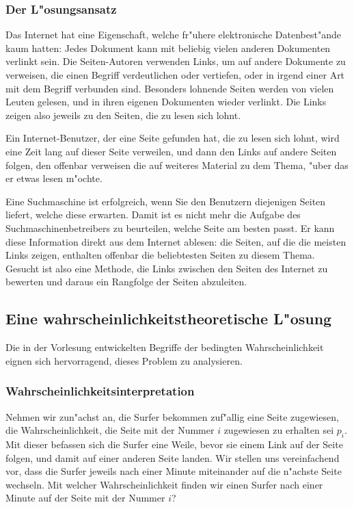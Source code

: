 \subsubsection{Der L"osungsansatz}
Das Internet hat eine Eigenschaft, welche fr"uhere elektronische 
Datenbest"ande kaum hatten: Jedes Dokument kann mit beliebig vielen anderen
Dokumenten verlinkt sein. Die Seiten-Autoren verwenden Links, um auf
andere Dokumente zu verweisen, die einen Begriff verdeutlichen oder
vertiefen, oder in irgend einer Art mit dem Begriff verbunden sind.
Besonders lohnende Seiten werden von vielen Leuten gelesen, und in ihren
eigenen Dokumenten wieder verlinkt. Die Links zeigen also jeweils zu den
Seiten, die zu lesen sich lohnt.

Ein Internet-Benutzer, der eine Seite gefunden hat, die zu lesen sich lohnt,
wird eine Zeit lang auf dieser Seite verweilen, und dann den Links auf
andere Seiten folgen, den offenbar verweisen die auf weiteres Material zu
dem Thema, "uber das er etwas lesen m"ochte.

Eine Suchmaschine ist erfolgreich, wenn Sie den Benutzern diejenigen Seiten
liefert, welche diese erwarten. Damit ist es nicht mehr die Aufgabe des
Suchmaschinenbetreibers zu beurteilen, welche Seite am besten passt. Er
kann diese Information direkt aus dem Internet ablesen: die Seiten, auf die
die meisten Links zeigen, enthalten offenbar die beliebtesten Seiten zu diesem
Thema. Gesucht ist also eine Methode, die Links zwischen den Seiten des
Internet zu bewerten und daraus ein Rangfolge der Seiten abzuleiten.

\subsection{Eine wahrscheinlichkeitstheoretische L"osung}
Die in der Vorlesung entwickelten Begriffe der bedingten Wahrscheinlichkeit
eignen sich hervorragend, dieses Problem zu analysieren.

\subsubsection{Wahrscheinlichkeitsinterpretation}
Nehmen wir zun"achst an, die Surfer bekommen zuf"allig eine Seite zugewiesen,
die Wahrscheinlichkeit, die Seite mit der Nummer $i$ zugewiesen zu erhalten
sei $p_i$.
Mit dieser befassen sich die Surfer eine Weile, bevor sie einem Link auf
der Seite folgen, und damit auf einer anderen Seite landen. Wir stellen
uns vereinfachend vor, dass die Surfer jeweils nach einer Minute miteinander
auf die n"achste Seite wechseln. Mit welcher Wahrscheinlichkeit finden wir
einen Surfer nach einer Minute auf der Seite mit der Nummer $i$?

